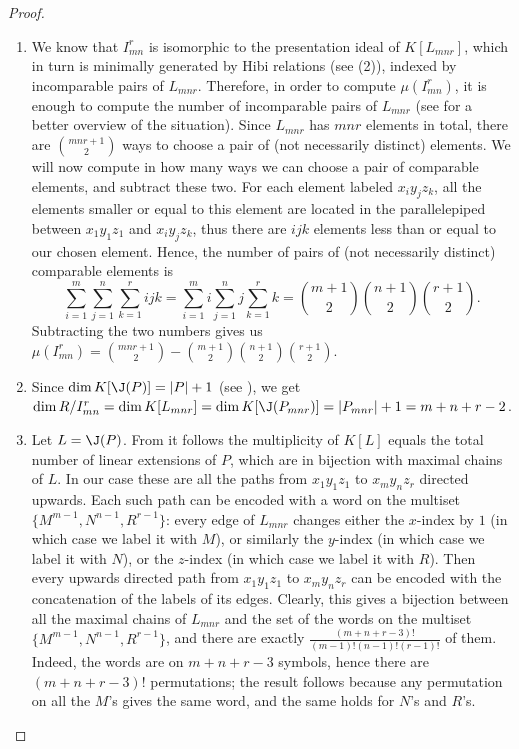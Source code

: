 \documentclass[12pt]{amsart}
\numberwithin{equation}{section}
\theoremstyle{definition}
\begin{document}
\begin{proof}
\begin{enumerate}        
        \item We know that $I_{mn}^r$ is isomorphic to the presentation ideal of $K[L_{mnr}]$, which in turn is minimally generated by Hibi relations (see (2)), indexed by incomparable pairs of $L_{mnr}$.
        Therefore, in order to compute $\mu(I_{mn}^r)$, it is enough to compute the number of incomparable pairs of $L_{mnr}$ (see  for a better overview of the situation). Since $L_{mnr}$ has $mnr$ elements in total, there are ${mnr+1} \choose 2$ ways to choose a pair of (not necessarily distinct) elements. We will now compute in how many ways we can choose a pair of comparable elements, and subtract these two. For each element labeled $x_iy_jz_k$, all the elements smaller or equal to this element are located in the parallelepiped between $x_1y_1z_1$ and $x_iy_jz_k$, thus there are $ijk$ elements less than or equal to our chosen element. Hence, the number of pairs of (not necessarily distinct) comparable elements is 
        $$
             \sum_{i=1}^{m} \sum_{j=1}^{n} \sum_{k=1}^{r}{ijk}=\sum_{i=1}^{m}{i}
            \sum_{j=1}^{n}{j}\sum_{k=1}^{r}{k}=
            {{m+1} \choose 2} {{n+1} \choose 2} {{r+1} \choose 2}.
        $$
        Subtracting the two numbers gives us $\mu(I_{mn}^r)={mnr+1\choose 2}-{m+1\choose 2}{n+1\choose 2} {r+1\choose 2}$. 
           \smallskip
        \item Since $\dim K[\J(P)]=|P|+1$ (see \cite{Hi}), we get $\dim R/I_{mn}^r=\dim K[L_{mnr}]=\dim K[\J(P_{mnr})]=|P_{mnr}|+1=m+n+r-2$.
           \smallskip
        \item Let $L=\J(P)$. From \cite[Proposition~2.3]{HiHi} it follows the multiplicity of $K[L]$ equals the total number of linear extensions of $P$, which are in bijection with maximal chains of $L$. In our case these are all the paths from $x_1y_1z_1$ to $x_{m}y_{n}z_{r}$ directed upwards. Each such path can be encoded with a word on the multiset $\{M^{m-1}, N^{n-1},R^{r-1}\}$: every edge of $L_{mnr}$ changes either the $x$-index by $1$ (in which case we label it with $M$), or similarly the $y$-index (in which case we label it with $N$), or the $z$-index (in which case we label it with $R$). Then every upwards directed path from $x_1y_1z_1$ to $x_{m}y_{n}z_{r}$ can be encoded with the concatenation of the labels of its edges.
        Clearly, this gives a bijection between all the maximal chains of $L_{mnr}$ and the set of the words on the multiset $\{M^{m-1}, N^{n-1},R^{r-1}\}$,  and there are exactly $\frac{(m+n+r-3)!}{(m-1)!(n-1)!(r-1)!}$ of them. Indeed, the words are on $m+n+r-3$ symbols, hence there are $(m+n+r-3)!$ permutations; the result follows because any permutation on all the $M$'s gives the same word, and the same holds for $N$'s and $R$'s. 

\end{enumerate}
\end{proof}
\end{document}
